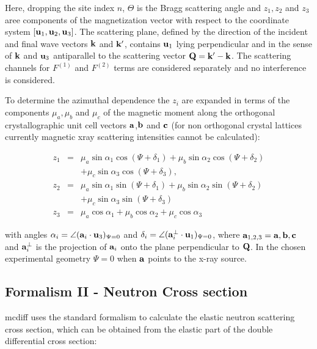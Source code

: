 Here, dropping the site index $n$, $\Theta$ is the Bragg scattering angle and
$z_1, z_2$ and $z_3$ aree components of the magnetization vector with respect
to the coordinate system $[\mathbf u_1,\mathbf u_2,\mathbf u_3]$. The scattering plane, defined by the
direction of the incident and final wave vectors  $\mathbf k$ and $\mathbf k'$, contains $\mathbf u_1$ lying
perpendicular and in the sense of $\mathbf k$ and $\mathbf u_3$ antiparallel to the scattering
vector $\mathbf Q=\mathbf k'-\mathbf k$. The scattering channels for $F^{(1)}$ and $F^(2)$ terms are considered
separately and no interference is considered. 

To determine the azimuthal dependence the $z_i$ are expanded in terms of the components
$\mu_a,\mu_b$ and $\mu_c$ of the magnetic moment along the orthogonal crystallographic
unit cell vectors $\mathbf a$,$\mathbf b$ and $\mathbf c$ (for non orthogonal
crystal lattices currently magnetic xray scattering intensities cannot
be calculated):

\begin{eqnarray}
z_1&=&\mu_a \sin \alpha_1 \cos(\Psi+\delta_1)+\mu_b \sin \alpha_2 \cos(\Psi +\delta_2) \nonumber \\
&& +\mu_c \sin \alpha_3 \cos (\Psi +\delta_3), \nonumber \\
z_2 & = & \mu_a \sin \alpha_1 \sin (\Psi +\delta_1)+\mu_b \sin \alpha_2 \sin (\Psi+\delta_2) \nonumber \\
& & +\mu_c \sin \alpha_3 \sin (\Psi +\delta_3) \nonumber \\
z_3 & = & \mu_a \cos \alpha_1 + \mu_b \cos \alpha_2 + \mu_c \cos \alpha_3 
\end{eqnarray}
 
with angles $\alpha_i=\angle(\mathbf a_i \cdot \mathbf u_3)_{\Psi=0}$ and $\delta_i=\angle(\mbf a_i^{\perp}\cdot %
\mbf u_1)_{\Psi=0}$, where $\mathbf a_{1,2,3}=\mathbf a,\mathbf b,\mathbf c$ and $\mathbf a_i^{\perp}$ is the projection of
$\mathbf a_i$ onto the plane perpendicular to $\mathbf Q$. In the chosen experimental geometry
$\Psi=0$ when $\mathbf a$ points to the x-ray source.


\subsection{Formalism II - Neutron Cross section}

{\prg mcdiff} uses the standard formalism to calculate the elastic neutron scattering
cross section, which can be obtained from the elastic part of the double differential
cross section:


